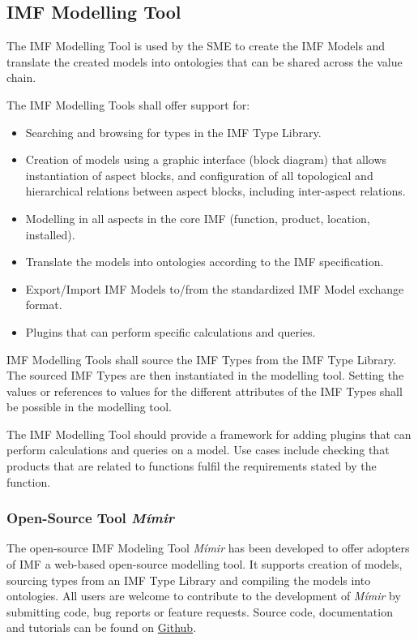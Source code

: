 \subsection{IMF Modelling Tool}
The IMF Modelling Tool is used by the SME to create the IMF Models and translate the
created models into ontologies that can be shared across the value chain.

The IMF Modelling Tools shall offer support for:

\begin{itemize}
  \item Searching and browsing for types in the IMF Type Library.
  \item Creation of models using a graphic interface (block diagram) that allows instantiation of aspect blocks, and
        configuration of all topological and hierarchical relations between aspect blocks, including inter-aspect relations.
  \item Modelling in all aspects in the core IMF (function, product, location, installed).
  \item Translate the models into ontologies according to the IMF specification.
  \item Export/Import IMF Models to/from the standardized IMF Model exchange format.
  \item Plugins that can perform specific calculations and queries.
\end{itemize}
IMF Modelling Tools shall source the IMF Types from the IMF Type Library. The sourced IMF Types are then instantiated
in the modelling tool. Setting the values or references to values for the different attributes of the IMF Types shall
be possible in the modelling tool.

The IMF Modelling Tool should provide a framework for adding plugins that can perform calculations and queries on a
model. Use cases include checking that products that are related to functions fulfil the requirements stated by the
function.


\subsubsection{Open-Source Tool \emph{Mímir}}

The open-source IMF Modeling Tool \emph{Mímir} has been developed to offer adopters of IMF a web-based open-source
modelling tool. It supports creation of models, sourcing types from an IMF Type Library and compiling the models into
ontologies. All users are welcome to contribute to the development of \emph{Mímir} by submitting code, bug reports
or feature requests. Source code, documentation and tutorials can be found on
\href{https://github.com/mimir-org/mimir}{Github}.

